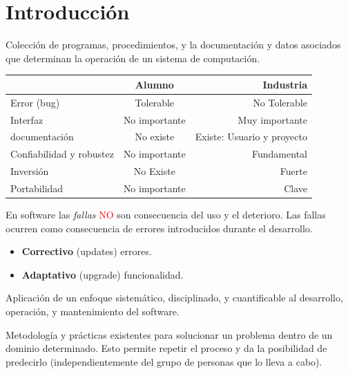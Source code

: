 \section{Introducción}

   Colección de programas,  procedimientos, y la documentación y   datos asociados que determinan la
  operación de un sistema de computación.

  \PN{}

  \begin{center}
    \begin{tabular}{ | l | c | r | }
      \hline
                                & Alumno          & Industria \\ \hline
      Error (bug)               & Tolerable       & No Tolerable \\ \hline
      Interfaz                  & No importante   & Muy importante \\ \hline
      documentación             & No existe       & Existe: Usuario y proyecto \\ \hline
      Confiabilidad y robustez  & No importante   & Fundamental \\ \hline
      Inversión                 & No Existe       & Fuerte \\ \hline
      Portabilidad              & No importante   & Clave \\ \hline
    \end{tabular}
  \end{center}

  \PN En software las \textit{fallas} \textcolor{red}{NO} son consecuencia del uso y el deterioro. Las fallas ocurren
    como consecuencia de errores introducidos durante el desarrollo.

  \PN{}
  \begin{itemize}
    \item \textbf{Correctivo} (updates) errores.
    \item \textbf{Adaptativo} (upgrade) funcionalidad.
  \end{itemize}

  \PN{} Aplicación de un enfoque sistemático,
  disciplinado, y cuantificable al desarrollo, operación, y
  mantenimiento del software.

  \PN{} Metodología y prácticas existentes para solucionar un problema dentro de un dominio
  determinado. Esto permite repetir el proceso y da la posibilidad de predecirlo (independientemente del grupo de 
  personas que lo lleva a cabo).

